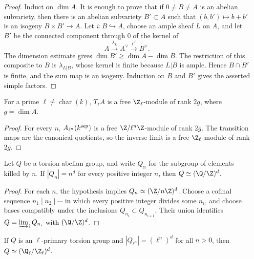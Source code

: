 \begin{proof}
Induct on $\dim A$.  It is enough to prove that if $0\ne B\ne A$ is an
abelian subvariety, then there is an abelian subvariety $B'\subset A$ such
that $(b,b')\mapsto b+b'$ is an isogeny $B\times B'\to A$.  Let
$i:B\hookrightarrow A$, choose an ample sheaf $L$ on $A$, and let $B'$ be
the connected component through $0$ of the kernel of
\[
A\xrightarrow{\lambda_L}A^\vee\xrightarrow{i^\vee}B^\vee.
\]
The dimension estimate gives $\dim B'\geq\dim A-\dim B$.  The restriction
of this composite to $B$ is $\lambda_{L|B}$, whose kernel is finite because
$L|B$ is ample.  Hence $B\cap B'$ is finite, and the sum map is an
isogeny.  Induction on $B$ and $B'$ gives the asserted simple factors.
\end{proof}

\begin{proposition}
\label{prop:milne-tate-rank}

For a prime $\ell\ne\operatorname{char}(k)$, $T_\ell A$ is a free
$\Z_\ell$-module of rank $2g$, where $g=\dim A$.
\end{proposition}

\begin{proof}
For every $n$, $A_{\ell^n}(k^{\rm sep})$ is a free
$\Z/\ell^n\Z$-module of rank $2g$.  The transition maps are the canonical
quotients, so the inverse limit is a free $\Z_\ell$-module of rank $2g$.
\end{proof}

\begin{lemma}
\label{lem:milne-torsion-group}

Let $Q$ be a torsion abelian group, and write $Q_n$ for the subgroup of
elements killed by $n$.  If $|Q_n|=n^d$ for every positive integer $n$, then
$Q\simeq(\Q/\Z)^d$.
\end{lemma}

\begin{proof}
For each $n$, the hypothesis implies $Q_n\simeq(\Z/n\Z)^d$.  Choose a
cofinal sequence $n_1\mid n_2\mid\cdots$ in which every positive integer
divides some $n_i$, and choose bases compatibly under the inclusions
$Q_{n_i}\subset Q_{n_{i+1}}$.  Their union identifies
$Q=\varinjlim_iQ_{n_i}$ with $(\Q/\Z)^d$.
\end{proof}

\begin{lemma}
\label{lem:milne-ell-primary-torsion}

If $Q$ is an $\ell$-primary torsion group and
$|Q_{\ell^n}|=(\ell^n)^d$ for all $n>0$, then
$Q\simeq(\Q_\ell/\Z_\ell)^d$.
\end{lemma}

